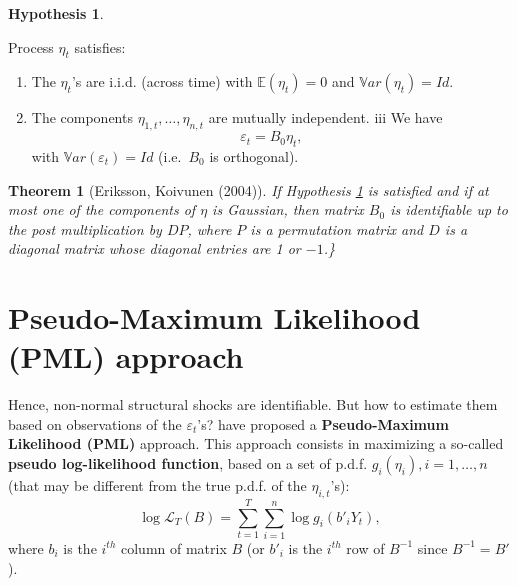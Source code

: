 \documentclass[
  12pt,
]{book}
\providecommand{\tightlist}{%
  \setlength{\itemsep}{0pt}\setlength{\parskip}{0pt}}
\newtheorem{theorem}{Theorem}[chapter]
\theoremstyle{definition}
\theoremstyle{definition}
\theoremstyle{definition}
\theoremstyle{definition}
\newtheorem{hypothesis}{Hypothesis}[chapter]
\theoremstyle{remark}
\begin{document}
\begin{hypothesis}
\protect\hypertarget{hyp:NonGauss}{}\label{hyp:NonGauss}

Process \(\eta_t\) satisfies:

\begin{enumerate}
\def\labelenumi{\roman{enumi}.}
\tightlist
\item
  The \(\eta_t\)'s are i.i.d. (across time) with \(\mathbb{E}(\eta_t) = 0\) and \(\mathbb{V}ar(\eta_t) = Id.\)
\item
  The components \(\eta_{1,t}, \ldots, \eta_{n,t}\) are mutually independent.
  iii We have
  \[
  \varepsilon_t = B_0 \eta_t,
  \]
  with \(\mathbb{V}ar(\varepsilon_t) = Id\) (i.e.~\(B_0\) is orthogonal).
\end{enumerate}

\end{hypothesis}

\begin{theorem}[Eriksson, Koivunen (2004)]
\protect\hypertarget{thm:EK2004}{}\label{thm:EK2004}If Hypothesis \ref{hyp:NonGauss} is satisfied and if at most one of the components of \(\eta\) is Gaussian, then matrix \(B_0\) is identifiable up to the post multiplication by \(DP\), where \(P\) is a permutation matrix and \(D\) is a diagonal matrix whose diagonal entries are 1 or \(-1\).\}
\end{theorem}

\hypertarget{pseudo-maximum-likelihood-pml-approach}{%
\section{Pseudo-Maximum Likelihood (PML) approach}\label{pseudo-maximum-likelihood-pml-approach}}

Hence, non-normal structural shocks are identifiable. But how to estimate them based on observations of the \(\varepsilon_t\)'s? \citet{Gourieroux_Monfort_Renne_2017} have proposed a \textbf{Pseudo-Maximum Likelihood (PML)} approach. This approach consists in maximizing a so-called \textbf{pseudo log-likelihood function}, based on a set of p.d.f. \(g_i (\eta_i), i=1,\ldots,n\) (that may be different from the true p.d.f. of the \(\eta_{i,t}\)'s):
\begin{equation}
\log \mathcal{L}_T (B) = \sum^T_{t=1} \sum^n_{i=1} \log g_i (b'_i Y_t),\label{eq:pseudolog}
\end{equation}
where \(b_i\) is the \(i^{th}\) column of matrix \(B\) (or \(b'_i\) is the \(i^{th}\) row of \(B^{-1}\) since \(B^{-1}=B'\)).
\end{document}

